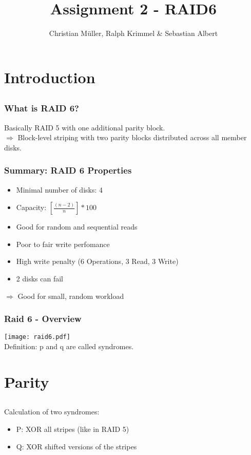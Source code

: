 \documentclass{beamer}
\title{Assignment 2 - RAID6}
\author{Christian Müller, Ralph Krimmel \& Sebastian Albert}
\begin{document}
\section{Introduction}
\subsection*{}
\begin{frame}
	\maketitle
\end{frame}


\begin{frame}
	\frametitle{What is RAID 6?}
	Basically RAID 5 with one additional parity block. \\
	$\Rightarrow$  Block-level striping with two parity blocks distributed across all member disks.
\end{frame}

\begin{frame}
	\frametitle{Summary: RAID 6 Properties}
	\begin{itemize}
		\item Minimal number of disks: 4 
		\item Capacity: $[\frac{(n-2)}{n}]*100$
		\item Good for random and sequential reads
		\item Poor to fair write perfomance
		\item High write penalty (6 Operations, 3 Read, 3 Write)
		\item 2 disks can fail
	\end{itemize}
	$\Rightarrow$ Good for small, random workload
\end{frame}


\begin{frame}
	\frametitle{Raid 6 - Overview}
	\texttt{[image: raid6.pdf]} \\
	Definition: p and q are called syndromes.
\end{frame}

\section{Parity}
\subsection*{}
\begin{frame}
	Calculation of two syndromes:
	\begin{itemize}
		\item P: XOR all stripes (like in RAID 5)
		\item Q: XOR shifted  versions of the stripes
	\end{itemize}
\end{frame}
\end{document}
